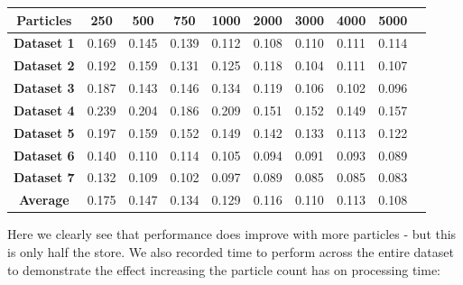 \documentclass{article}
\begin{document}
\begin{table}[H]
    \centering
    \begin{tabular}{|c|c|c|c|c|c|c|c|c|c|}
        \hline
        \textbf{Particles} & \textbf{250} & \textbf{500} & \textbf{750} & \textbf{1000} & \textbf{2000} & \textbf{3000} & \textbf{4000} & \textbf{5000} \\ \hline
        \textbf{Dataset 1} & 0.169        & 0.145        & 0.139        & 0.112         & 0.108         & 0.110         & 0.111         & 0.114         \\ \hline
        \textbf{Dataset 2} & 0.192        & 0.159        & 0.131        & 0.125         & 0.118         & 0.104         & 0.111         & 0.107         \\ \hline
        \textbf{Dataset 3} & 0.187        & 0.143        & 0.146        & 0.134         & 0.119         & 0.106         & 0.102         & 0.096         \\ \hline
        \textbf{Dataset 4} & 0.239        & 0.204        & 0.186        & 0.209         & 0.151         & 0.152         & 0.149         & 0.157         \\ \hline
        \textbf{Dataset 5} & 0.197        & 0.159        & 0.152        & 0.149         & 0.142         & 0.133         & 0.113         & 0.122         \\ \hline
        \textbf{Dataset 6} & 0.140        & 0.110        & 0.114        & 0.105         & 0.094         & 0.091         & 0.093         & 0.089         \\ \hline
        \textbf{Dataset 7} & 0.132        & 0.109        & 0.102        & 0.097         & 0.089         & 0.085         & 0.085         & 0.083         \\ \hline
        \textbf{Average}   & 0.175        & 0.147        & 0.134        & 0.129         & 0.116         & 0.110         & 0.113         & 0.108         \\ \hline
    \end{tabular}
\end{table}

Here we clearly see that performance does improve with more particles - but this is only half the store. We also recorded time to perform across the entire dataset to demonstrate the effect increasing the particle count has on processing time:
\end{document}
